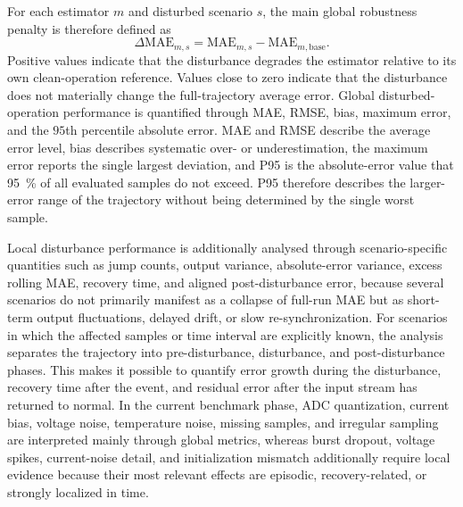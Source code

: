 \documentclass[
    a4paper,
    12pt,
    titlepage,
    bibliography=totoc,
    twoside=on,
    parskip=false,
    numbers=noenddot,
    cleardoublepage=empty,
    DIV=12,
    BCOR=12.0mm,
    headheight=36pt,
    headings=openright
]{scrreprt}
\begin{document}
For each estimator $m$ and disturbed scenario $s$, the main global robustness penalty is therefore defined as
\begin{equation}
    \Delta\mathrm{MAE}_{m,s}
    =
    \mathrm{MAE}_{m,s}
    -
    \mathrm{MAE}_{m,\mathrm{base}} .
    \label{eq:robustness_delta_mae}
\end{equation}
Positive values indicate that the disturbance degrades the estimator relative to its own clean-operation reference. Values close to zero indicate that the disturbance does not materially change the full-trajectory average error. Global disturbed-operation performance is quantified through MAE, RMSE, bias, maximum error, and the $95$th percentile absolute error. MAE and RMSE describe the average error level, bias describes systematic over- or underestimation, the maximum error reports the single largest deviation, and P95 is the absolute-error value that \SI{95}{\percent} of all evaluated samples do not exceed. P95 therefore describes the larger-error range of the trajectory without being determined by the single worst sample.

Local disturbance performance is additionally analysed through scenario-specific quantities such as jump counts, output variance, absolute-error variance, excess rolling MAE, recovery time, and aligned post-disturbance error, because several scenarios do not primarily manifest as a collapse of full-run MAE but as short-term output fluctuations, delayed drift, or slow re-synchronization. For scenarios in which the affected samples or time interval are explicitly known, the analysis separates the trajectory into pre-disturbance, disturbance, and post-disturbance phases. This makes it possible to quantify error growth during the disturbance, recovery time after the event, and residual error after the input stream has returned to normal. In the current benchmark phase, ADC quantization, current bias, voltage noise, temperature noise, missing samples, and irregular sampling are interpreted mainly through global metrics, whereas burst dropout, voltage spikes, current-noise detail, and initialization mismatch additionally require local evidence because their most relevant effects are episodic, recovery-related, or strongly localized in time.
\end{document}
